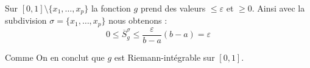 {\begin{enumerate}
{Sur $[0,1]\setminus \{x_1,\ldots,x_p\}$ la fonction $g$ prend des valeurs
$\le \varepsilon$ et $\ge 0$. Ainsi avec la subdivision
$\sigma = \{x_1,\ldots,x_p\}$ nous obtenons :
\begin{equation*}
 0 \leq \overline{S}_{g}^{\sigma} \leq \frac{\varepsilon}{b-a} (b-a) = \varepsilon
\end{equation*}


Comme On en conclut que $g$ est Riemann-int\'egrable sur $[0,1]$.}
\end{enumerate}
}
